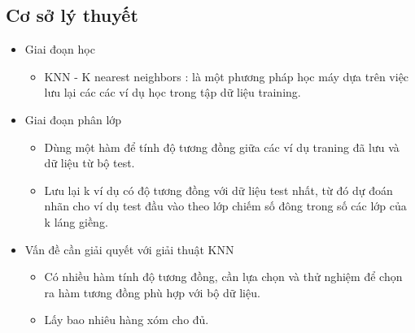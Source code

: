 \documentclass[a4paper,12pt]{report}
\begin{document}
\subsection{Cơ sở lý thuyết}
\begin{itemize}
\item Giai đoạn học
\begin{itemize}
\item KNN - K nearest neighbors : là một phương pháp học máy dựa trên việc lưu lại các các ví dụ học trong tập dữ liệu training.
\end{itemize}
\item Giai đoạn phân lớp
\begin{itemize}
\item Dùng một hàm để tính độ tương đồng giữa các ví dụ traning đã lưu và dữ liệu từ bộ test.
\item Lưu lại k ví dụ có độ tương đồng với dữ liệu test nhất, từ đó dự đoán nhãn cho ví dụ test đầu vào theo lớp chiếm số đông trong số các lớp của k láng giềng. 
\end{itemize}
\item Vấn đề cần giải quyết với giải thuật KNN
\begin{itemize}
\item Có nhiều hàm tính độ tương đồng, cần lựa chọn và thử nghiệm để chọn ra hàm tương đồng phù hợp với bộ dữ liệu.
\item Lấy bao nhiêu hàng xóm cho đủ. 
\end{itemize}
\end{itemize}
\end{document}

